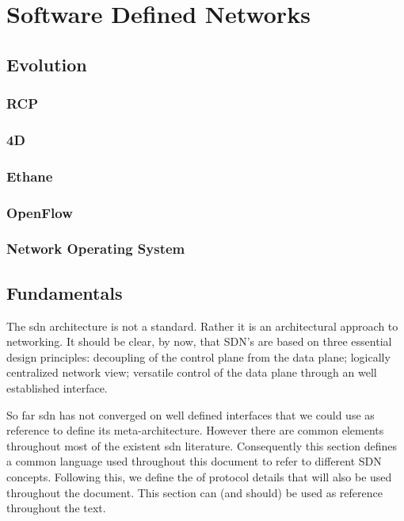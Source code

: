\glsresetall

\section{Software Defined Networks}

\subsection{Evolution}

\subsubsection{RCP}
\subsubsection{4D}
\subsubsection{Ethane}
\subsubsection{OpenFlow}
\label{sec:related:openflow}
\subsubsection{Network Operating System}

\glsresetall

\subsection{Fundamentals}
The \gls{sdn} architecture is not a standard. Rather it is an architectural approach to networking. It should be clear, by now, that SDN's are based on three essential design principles: decoupling of the control plane from the data plane; logically centralized network view;  versatile control of the data plane through an well established interface. 

So far \gls{sdn}  has not converged on well defined interfaces that we could use as reference to define its meta-architecture. 
However there are common elements throughout most of the existent \gls{sdn} literature. 
Consequently this section defines a common language  used throughout this document to refer to different SDN concepts. Following this,  we define the \gls{of} protocol details that will also be used throughout the document. This section can (and should) be used as reference throughout the text. 


